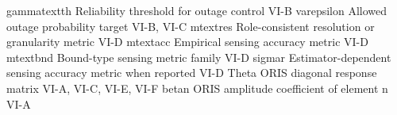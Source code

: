{}\markdownRendererPipe{} \markdownRendererDollarSign{}\markdownRendererBackslash{}gamma\markdownRendererUnderscore{}\markdownRendererLeftBrace{}\markdownRendererBackslash{}text\markdownRendererLeftBrace{}th\markdownRendererRightBrace{}\markdownRendererRightBrace{}\markdownRendererDollarSign{} \markdownRendererPipe{} Reliability threshold for outage control \markdownRendererPipe{} VI-B \markdownRendererPipe{}\markdownRendererSoftLineBreak
{}\markdownRendererPipe{} \markdownRendererDollarSign{}\markdownRendererBackslash{}varepsilon\markdownRendererDollarSign{} \markdownRendererPipe{} Allowed outage probability target \markdownRendererPipe{} VI-B, VI-C \markdownRendererPipe{}\markdownRendererSoftLineBreak
{}\markdownRendererPipe{} \markdownRendererDollarSign{}m\markdownRendererUnderscore{}\markdownRendererLeftBrace{}\markdownRendererBackslash{}text\markdownRendererLeftBrace{}res\markdownRendererRightBrace{}\markdownRendererRightBrace{}\markdownRendererDollarSign{} \markdownRendererPipe{} Role-consistent resolution or granularity metric \markdownRendererPipe{} VI-D \markdownRendererPipe{}\markdownRendererSoftLineBreak
{}\markdownRendererPipe{} \markdownRendererDollarSign{}m\markdownRendererUnderscore{}\markdownRendererLeftBrace{}\markdownRendererBackslash{}text\markdownRendererLeftBrace{}acc\markdownRendererRightBrace{}\markdownRendererRightBrace{}\markdownRendererDollarSign{} \markdownRendererPipe{} Empirical sensing accuracy metric \markdownRendererPipe{} VI-D \markdownRendererPipe{}\markdownRendererSoftLineBreak
{}\markdownRendererPipe{} \markdownRendererDollarSign{}m\markdownRendererUnderscore{}\markdownRendererLeftBrace{}\markdownRendererBackslash{}text\markdownRendererLeftBrace{}bnd\markdownRendererRightBrace{}\markdownRendererRightBrace{}\markdownRendererDollarSign{} \markdownRendererPipe{} Bound-type sensing metric family \markdownRendererPipe{} VI-D \markdownRendererPipe{}\markdownRendererSoftLineBreak
{}\markdownRendererPipe{} \markdownRendererDollarSign{}\markdownRendererBackslash{}sigma\markdownRendererUnderscore{}r\markdownRendererDollarSign{} \markdownRendererPipe{} Estimator-dependent sensing accuracy metric when reported \markdownRendererPipe{} VI-D \markdownRendererPipe{}\markdownRendererSoftLineBreak
{}\markdownRendererPipe{} \markdownRendererDollarSign{}\markdownRendererBackslash{}Theta\markdownRendererDollarSign{} \markdownRendererPipe{} ORIS diagonal response matrix \markdownRendererPipe{} VI-A, VI-C, VI-E, VI-F \markdownRendererPipe{}\markdownRendererSoftLineBreak
{}\markdownRendererPipe{} \markdownRendererDollarSign{}\markdownRendererBackslash{}beta\markdownRendererUnderscore{}n\markdownRendererDollarSign{} \markdownRendererPipe{} ORIS amplitude coefficient of element \markdownRendererDollarSign{}n\markdownRendererDollarSign{} \markdownRendererPipe{} VI-A \markdownRendererPipe{}\markdownRendererSoftLineBreak
